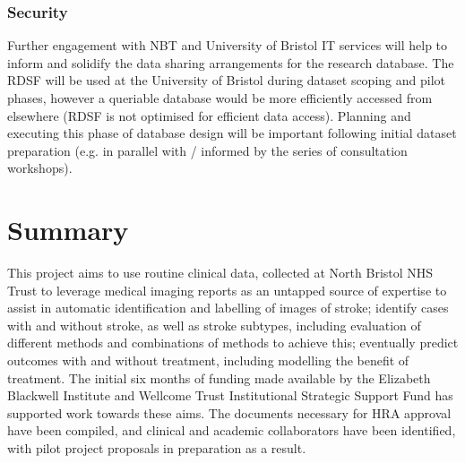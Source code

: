 \documentclass{article}
\begin{document}
\subsubsection{Security}

Further engagement with NBT and University of Bristol IT services will
help to inform and solidify the data sharing arrangements for the
research database. The RDSF will be used at the University of Bristol
during dataset scoping and pilot phases, however a queriable database
would be more efficiently accessed from elsewhere (RDSF is not
optimised for efficient data access). Planning and executing this
phase of database design will be important following initial dataset
preparation (e.g. in parallel with / informed by the series of
consultation workshops).

\section{Summary}

This project aims to use routine clinical data, collected at North
Bristol NHS Trust to leverage medical imaging reports as an untapped
source of expertise to assist in automatic identification and
labelling of images of stroke; identify cases with and without stroke,
as well as stroke subtypes, including evaluation of different methods
and combinations of methods to achieve this; eventually predict
outcomes with and without treatment, including modelling the benefit
of treatment. The initial six months of funding made available by the
Elizabeth Blackwell Institute and Wellcome Trust Institutional
Strategic Support Fund has supported work towards these aims. The
documents necessary for HRA approval have been compiled, and clinical
and academic collaborators have been identified, with pilot project
proposals in preparation as a result. 



\appendix
\end{document}

